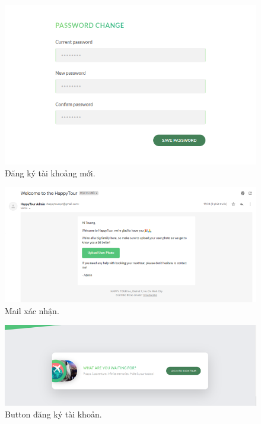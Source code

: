 
\begin{figure}[ht]
    \centering
    \includegraphics[width = 1\linewidth]{figures/demo/11.png}
    \caption{Đăng ký tài khoảng mới.}
    \label{fig:example_1}
\end{figure}

\vspace{10cm}


\begin{figure}[ht]
    \centering
    \includegraphics[width = 1\linewidth]{figures/demo/mail.png}
    \caption{Mail xác nhận.}
    \label{fig:example_1}
\end{figure}

\begin{figure}[ht]
    \centering
    \includegraphics[width = 1\linewidth]{figures/demo/6.png}
    \caption{Button đăng ký tài khoản.}
    \label{fig:example_1}
\end{figure}

